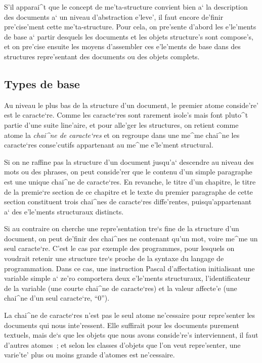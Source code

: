 S'il apparai^t que le concept de me'ta-structure convient bien a` la
description des documents a` un niveau d'abstraction e'leve', il faut encore
de'finir pre'cise'ment cette me'ta-structure. Pour cela, on pre'sente d'abord
les e'le'ments de base a` partir desquels les documents et les objets
structure's sont compose's, et on pre'cise ensuite les moyens d'assembler
ces e'le'ments de base dans des structures repre'sentant des documents ou
des objets complets.

\subsection{Types de base}

Au niveau le plus bas de la structure d'un document, le premier atome
conside're' est le caracte`re. Comme les caracte`res sont rarement
isole's mais font pluto^t partie d'une suite line'aire, et pour alle'ger
les structures, on retient comme atome la {\em chai^ne de caracte`res}
et on regroupe dans une me^me chai^ne les caracte`res conse'cutifs appartenant
au me^me e'le'ment structural.

Si on ne raffine pas la structure d'un document jusqu'a` descendre au
niveau des mots ou des phrases, on peut conside'rer que le contenu
d'un simple paragraphe est une unique chai^ne de caracte`res. En revanche,
le titre d'un chapitre, le titre de la premie`re section de ce chapitre
et le texte du premier paragraphe de cette section constituent trois
chai^nes de caracte`res diffe'rentes, puisqu'appartenant a` des e'le'ments
structuraux distincts.

Si au contraire on cherche une repre'sentation tre`s
fine de la structure d'un document, on peut de'finir des chai^nes ne
contenant qu'un mot, voire me^me un seul caracte`re. C'est le cas par exemple
des programmes, pour lesquels on voudrait retenir une structure tre`s
proche de la syntaxe du langage de programmation. Dans ce cas, une instruction
Pascal d'affectation initialisant une variable simple a` ze'ro comportera
deux e'le'ments structuraux, l'identificateur de la variable
(une courte chai^ne de caracte`res) et la valeur affecte'e (une chai^ne d'un
seul caracte`re, ``0'').

La chai^ne de caracte`res n'est pas le seul atome ne'cessaire pour
repre'senter les documents qui nous inte'ressent. Elle suffirait pour les
documents purement textuels, mais de`s que les objets que nous avons
conside're's interviennent, il faut d'autres atomes~; et selon les classes
d'objets que l'on veut repre'senter, une varie'te' plus ou moins grande
d'atomes est ne'cessaire.

